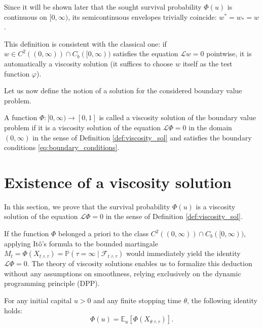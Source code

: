 \documentclass[smallextended]{svjour3}
\begin{document}
\begin{remark}
Since it will be shown later that the sought survival probability $\Phi(u)$ is continuous on $[0, \infty)$, its semicontinuous envelopes trivially coincide: $w^* = w_* = w$.
\end{remark}

\begin{remark}
This definition is consistent with the classical one: if $w \in C^2((0, \infty)) \cap C_b([0, \infty))$ satisfies the equation $\mathcal{L}w = 0$ pointwise, it is automatically a viscosity solution (it suffices to choose $w$ itself as the test function $\varphi$). 
\end{remark}

Let us now define the notion of a solution for the considered boundary value problem.

\begin{definition}
\label{def:viscosity_bvp_sol}
A function $\Phi:[0, \infty) \to [0, 1]$ is called a viscosity solution of the boundary value problem if it is a viscosity solution of the equation $\mathcal{L} \Phi = 0$ in the domain $(0, \infty)$ in the sense of Definition \ref{def:viscosity_sol} and satisfies the boundary conditions \eqref{eq:boundary_conditions}.
\end{definition}

\section{Existence of a viscosity solution}
\label{sec:existence}

In this section, we prove that the survival probability $\Phi(u)$ is a viscosity solution of the equation $\mathcal{L} \Phi = 0$ in the sense of Definition \ref{def:viscosity_sol}. 

If the function $\Phi$ belonged a priori to the class $C^2((0, \infty)) \cap C_b([0, \infty))$, applying It\^{o}'s formula to the bounded martingale $M_t = \Phi(X_{t \wedge \tau}) = \mathbb{P}(\tau = \infty \mid \mathcal{F}_{t \wedge \tau})$ would immediately yield the identity $\mathcal{L}\Phi = 0$. The theory of viscosity solutions enables us to formalize this deduction without any assumptions on smoothness, relying exclusively on the dynamic programming principle (DPP).

\begin{theorem}
\label{thm:DPP}
For any initial capital $u > 0$ and any finite stopping time $\theta$, the following identity holds:
$$ \Phi(u) = \mathbb{E}_u[\Phi(X_{\theta \wedge \tau})]. $$
\end{theorem}
\end{document}
